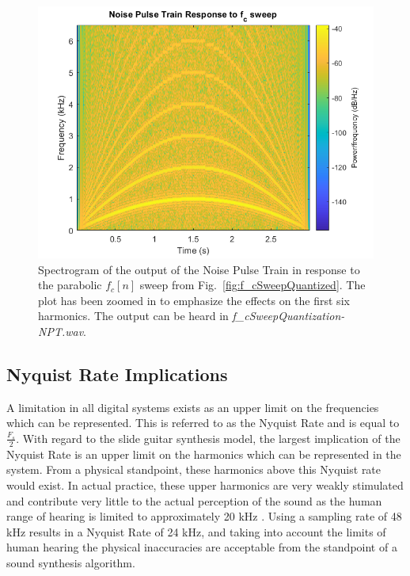 \documentclass[../main.tex]{subfiles}
\begin{document}
\clearpage

\setcounter{footnote}{0} 

\begin{figure}[h!]
    \centering
    \includegraphics[scale=.50]{./images/plots/f_cSweepNPT.png}
    \caption[Caption for quantized spectrogram]{Spectrogram of the output of the Noise Pulse Train in response to the parabolic $f_c[n]$ sweep from Fig.~\ref{fig:f_cSweepQuantized}. The plot has been zoomed in to emphasize the effects on the first six harmonics. The output can be heard in \emph{f\_cSweepQuantization-NPT.wav}\footnotemark.}
    \label{fig:f_cQuantizedSpectrum}
\end{figure}


\subsection{Nyquist Rate Implications}
A limitation in all digital systems exists as an upper limit on the frequencies which can be represented. This is referred to as the Nyquist Rate and is equal to $\frac{F_s}{2}$. With regard to the slide guitar synthesis model, the largest implication of the Nyquist Rate is an upper limit on the harmonics which can be represented in the system. From a physical standpoint, these harmonics above this Nyquist rate would exist. In actual practice, these upper harmonics are very weakly stimulated and contribute very little to the actual perception of the sound as the human range of hearing is limited to approximately 20 kHz . Using a sampling rate of 48 kHz results in a Nyquist Rate of 24 kHz, and taking into account the limits of human hearing the physical inaccuracies are acceptable from the standpoint of a sound synthesis algorithm.
\end{document}
